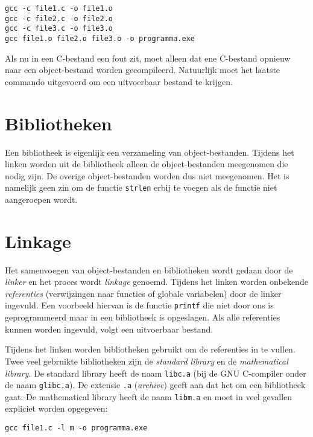 \begin{lstlisting}[style=lstoneline]
gcc -c file1.c -o file1.o
gcc -c file2.c -o file2.o
gcc -c file3.c -o file3.o
gcc file1.o file2.o file3.o -o programma.exe
\end{lstlisting}

Als nu in een C-bestand een fout zit, moet alleen dat ene C-bestand opnieuw naar een object-bestand worden gecompileerd. Natuurlijk moet het laatste commando uitgevoerd om een uitvoerbaar bestand te krijgen.


\section{Bibliotheken}
Een bibliotheek is eigenlijk een verzameling van object-bestanden. Tijdens het linken worden uit de bibliotheek alleen de object-bestanden meegenomen die nodig zijn. De overige object-bestanden worden dus niet meegenomen. Het is namelijk geen zin om de functie \texttt{strlen} erbij te voegen als de functie niet aangeroepen wordt.


\section{Linkage}
\label{sec:comlinkage}
Het samenvoegen van object-bestanden en bibliotheken wordt gedaan door de \textsl{linker} en het proces wordt \textsl{linkage} genoemd. Tijdens het linken worden onbekende \textsl{referenties} (verwijzingen naar functies of globale variabelen) door de linker ingevuld. Een voorbeeld hiervan is de functie \texttt{printf} die niet door ons is geprogrammeerd maar in een bibliotheek is opgeslagen. Als alle referenties kunnen worden ingevuld, volgt een uitvoerbaar bestand.

Tijdens het linken worden bibliotheken gebruikt om de referenties in te vullen. 
Twee veel gebruikte bibliotheken zijn de \textsl{standard library} en de \textsl{mathematical library}. De standard library heeft de naam \texttt{libc.a} (bij de GNU C-compiler onder de naam \texttt{glibc.a}). De extensie \texttt{.a} (\textsl{archive}) geeft aan dat het om een bibliotheek gaat. De mathematical library heeft de naam \texttt{libm.a} en moet in veel gevallen expliciet worden opgegeven:

\begin{lstlisting}[style=lstoneline]
gcc file1.c -l m -o programma.exe
\end{lstlisting}

